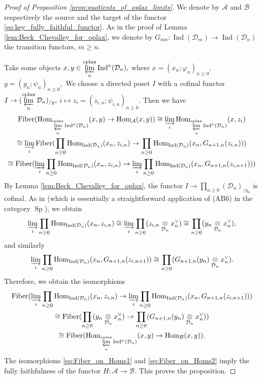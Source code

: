 \documentclass[11pt,leqno]{amsart}
\numberwithin{equation}{section}
\def\Hom{\operatorname{Hom}}
\newcommand{\tens}[1]{%
  \mathbin{\mathop{\otimes}\displaylimits_{#1}}%
}
\newcommand{\indlim}[1][]{\mathop{\varinjlim}\limits_{#1}}
\newcommand{\prolim}[1][]{\mathop{\varprojlim}\limits_{#1}}
\newcommand{\prodd}[1][]{\mathop{\prod}\limits_{#1}}
\newcommand{\oplax}{\operatorname{oplax}}
\newcommand{\Fiber}{\operatorname{Fiber}}
\newcommand{\cD}{{\mathcal D}}
\newcommand{\cA}{{\mathcal A}}
\newcommand{\cB}{{\mathcal B}}
\newcommand{\Sp}{\operatorname{Sp}}
\newcommand{\Ind}{\operatorname{Ind}}
\begin{document}
\begin{proof}[Proof of Proposition \ref{prop:quotients_of_oplax_limits}]
We denote by $\cA$ and $\cB$ respectively the source and the target of the functor \eqref{eq:key_fully_faithful_functor}. As in the proof of Lemma \ref{lem:Beck_Chevalley_for_oplax}, we denote by $G_{mn}:\Ind(\cD_m)\to\Ind(\cD_n)$ the transition functors, $m\geq n.$ 

Take some objects $x,y\in\prolim[n]^{\oplax}\Ind^{\kappa}(\cD_n),$ where $x=(x_n;\varphi_n)_{n\geq 0},$ $y=(y_n;\psi_n)_{n\geq 0},$ We choose a directed poset $I$ with a cofinal functor $I\to (\prolim[n]^{\oplax}\cD_n)_{/y},$ $i\mapsto z_i=(z_{i,n};\psi_{i,n})_{n\geq 0}.$ Then we have
\begin{multline}\label{eq:Fiber_on_Homs1}
\Fiber(\Hom_{\prolim[n]^{\oplax}\Ind^{\kappa}(\cD_n)}(x,y)\to \Hom_{\cA}(x,y))\cong \indlim[i]\Hom_{\prolim[n]^{\oplax}\Ind^{\kappa}(\cD_n)}(x,z_i)\\
\cong \indlim[i]\Fiber(\prodd[n\geq 0]\Hom_{\Ind(\cD_n)}(x_n,z_{i,n})\to \prodd[n\geq 0]\Hom_{\Ind(\cD_n)}(x_n,G_{n+1,n}(z_{i,n})))\\
\cong \Fiber(\indlim[i]\prodd[n\geq 0]\Hom_{\Ind(\cD_n)}(x_n,z_{i,n})\to \indlim[i]\prodd[n\geq 0]\Hom_{\Ind(\cD_n)}(x_n,G_{n+1,n}(z_{i,n+1})))
\end{multline}
By Lemma \ref{lem:Beck_Chevalley_for_oplax}, the functor $I\to \prodd[n\geq 0](\cD_n)_{/y_n}$ is cofinal. As in \cite[Proposition 1.101]{E24} (which is essentially a straightforward application of (AB6) in the category $\Sp$), we obtain
\begin{equation*}
\indlim[i]\prodd[n\geq 0]\Hom_{\Ind(\cD_n)}(x_n,z_{i,n})\cong \indlim[i]\prodd[n\geq 0](z_{i,n}\tens{\cD_n}x_n^{\vee})\cong \prodd[n\geq 0](y_n\tens{\cD_n}x_n^{\vee}),
\end{equation*}
and similarly
\begin{equation*}
	\indlim[i]\prodd[n\geq 0]\Hom_{\Ind(\cD_n)}(x_n,G_{n+1,n}(z_{i,n+1}))\cong \prodd[n\geq 0](G_{n+1,n}(y_n)\tens{\cD_n}x_n^{\vee}).
\end{equation*}
Therefore, we obtain the isomorphisms
\begin{multline}\label{eq:Fiber_on_Homs2}
\Fiber(\indlim[i]\prodd[n\geq 0]\Hom_{\Ind(\cD_n)}(x_n,z_{i,n})\to \indlim[i]\prodd[n\geq 0]\Hom_{\Ind(\cD_n)}(x_n,G_{n+1,n}(z_{i,n+1})))\\
\cong \Fiber(\prodd[n\geq 0](y_n\tens{\cD_n}x_n^{\vee})\to \prodd[n\geq 0](G_{n+1,n}(y_n)\tens{\cD_n}x_n^{\vee}))\\
\cong \Fiber(\Hom_{\prolim[n]^{\oplax}\Ind^{\kappa}(\cD_n)}(x,y)\to \Hom_{\cB}(x,y)). 
\end{multline}
The isomorphisms \eqref{eq:Fiber_on_Homs1} and \eqref{eq:Fiber_on_Homs2} imply the fully faithfulness of the functor $H:\cA\to\cB.$ This proves the proposition.
\end{proof}
\end{document}
